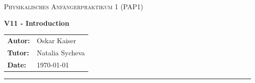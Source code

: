 \documentclass[11pt, a4paper, titlepage]{scrartcl}
\newcommand{\versuchstitel}{V11 - Introduction}
\newcommand{\praktikumstitel}{Physikalisches Anfängerpraktikum 1 (PAP1)}
\newcommand{\autor}{Oskar Kaiser}
\newcommand{\tutor}{Natalia Sycheva}
\newcommand{\datum}{\today}
\begin{document}
\begin{titlepage}
    \centering
    {\scshape\Large \praktikumstitel \par}
    \vspace{0.8cm}
    {\huge\bfseries \versuchstitel \par}
    \vspace{1.2cm}


    \vspace{0.8cm}

    \begin{tabular}{ll}
        \textbf{Autor:} & \autor \\
        \textbf{Tutor:} & \tutor \\
        \textbf{Date:} & \datum \\
    \end{tabular}

    \vfill
    \hrule
    \vspace{0.5cm}

    \begin{minipage}{\textwidth}
        \setcounter{tocdepth}{2}
        \tableofcontents
    \end{minipage}
    \vspace{2.5cm}
\end{titlepage}





%

\printbibliography[heading=bibintoc]
\end{document}
